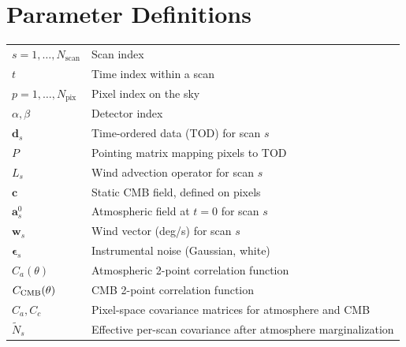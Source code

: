 \section*{Parameter Definitions}

\begin{tabular}{ll}
$s = 1, \ldots, N_{\text{scan}}$ & Scan index \\
$t$ & Time index within a scan \\
$p = 1, \ldots, N_{\text{pix}}$ & Pixel index on the sky \\
$\alpha, \beta$ & Detector index \\
$\mathbf{d}_s$ & Time-ordered data (TOD) for scan $s$ \\
$P$ & Pointing matrix mapping pixels to TOD \\
$L_s$ & Wind advection operator for scan $s$ \\
$\mathbf{c}$ & Static CMB field, defined on pixels \\
$\mathbf{a}_s^0$ & Atmospheric field at $t=0$ for scan $s$ \\
$\mathbf{w}_s$ & Wind vector (deg/s) for scan $s$ \\
$\boldsymbol{\epsilon}_s$ & Instrumental noise (Gaussian, white) \\
$C_a(\theta)$ & Atmospheric 2-point correlation function \\
$C_{\rm CMB}(\theta)$ & CMB 2-point correlation function \\
$C_a, C_c$ & Pixel-space covariance matrices for atmosphere and CMB \\
$\tilde{N}_s$ & Effective per-scan covariance after atmosphere marginalization
\end{tabular}